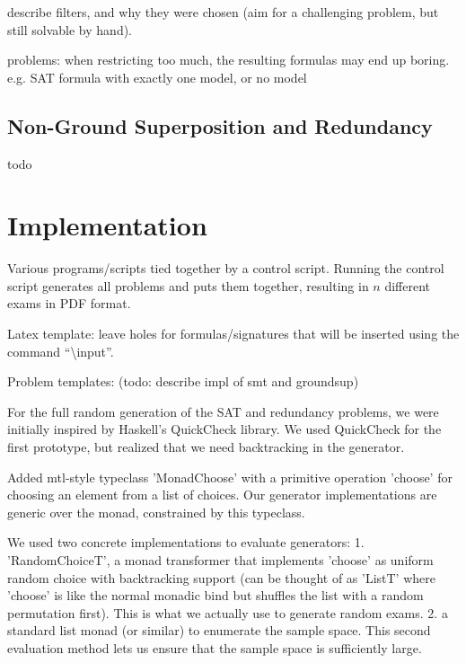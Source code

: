 \documentclass[12pt]{llncs}
\begin{document}
describe filters, and why they were chosen (aim for a challenging problem, but still solvable by hand).

problems:
when restricting too much, the resulting formulas may end up boring.
e.g. SAT formula with exactly one model, or no model


\subsection{Non-Ground Superposition and Redundancy}

todo


\section{Implementation}

Various programs/scripts tied together by a control script.
Running the control script generates all problems and puts them together, resulting in $n$ different exams in PDF format.


Latex template:
leave holes for formulas/signatures that will be inserted using the command ``\textbackslash{}input''.


Problem templates: (todo: describe impl of smt and groundsup)


For the full random generation of the SAT and redundancy problems,
we were initially inspired by Haskell's QuickCheck library.
We used QuickCheck for the first prototype, but realized that we need backtracking in the generator.

Added mtl-style typeclass 'MonadChoose' with a primitive operation 'choose' for choosing an element from a list of choices.
Our generator implementations are generic over the monad, constrained by this typeclass.

We used two concrete implementations to evaluate generators:
1. 'RandomChoiceT', a monad transformer that implements 'choose' as uniform random choice with backtracking support
    (can be thought of as 'ListT' where 'choose' is like the normal monadic bind but shuffles the list with a random permutation first).
    This is what we actually use to generate random exams.
2. a standard list monad (or similar) to enumerate the sample space.
    This second evaluation method lets us ensure that the sample space is sufficiently large.
\end{document}

